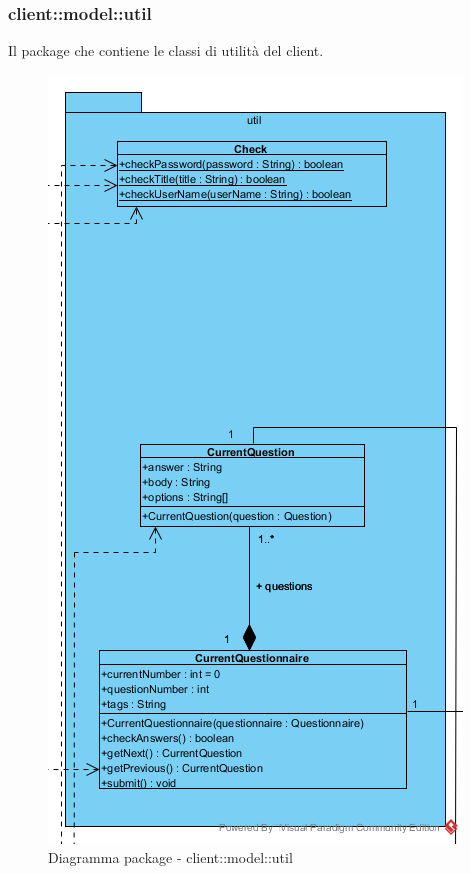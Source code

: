 \subsubsection{client::model::util}
Il package che contiene le classi di utilità del client.\begin{center}
		\begin{figure}[H]
			\centering \includegraphics[scale=4, max width=\textwidth, max height=\myheight]{../img/diagrammiClassi/client/model/util.png}
			\caption{Diagramma package - client::model::util}
		\end{figure}
	\end{center}\hypertarget{client::model::util::Check}{}
